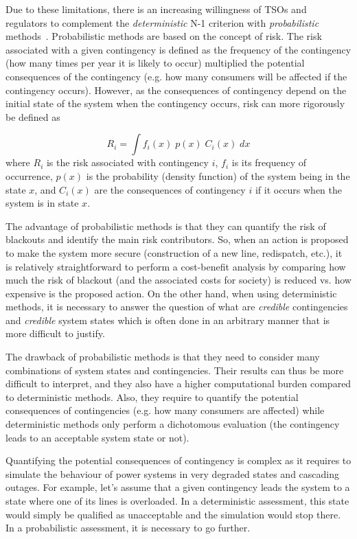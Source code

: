 Due to these limitations, there is an increasing willingness of TSOs and regulators to complement the \emph{deterministic} N-1 criterion with \emph{probabilistic} methods~\cite{ACER}. Probabilistic methods are based on the concept of risk. The risk associated with a given contingency is defined as the frequency of the contingency (how many times per year it is likely to occur) multiplied the potential consequences of the contingency (e.g. how many consumers will be affected if the contingency occurs). However, as the consequences of contingency depend on the initial state of the system when the contingency occurs, risk can more rigorously be defined as

\begin{equation}
    \label{eq:risk}
    {R_i = \int f_i(x) \; p(x) \; C_i(x) \; dx}
\end{equation}
\noindent where \(R_i\) is the risk associated with contingency \(i\), \(f_i\) is its frequency of occurrence, \(p(x)\) is the probability (density function) of the system being in the state \(x\), and \(C_i(x)\) are the consequences of contingency \(i\) if it occurs when the system is in state \(x\).

The advantage of probabilistic methods is that they can quantify the risk of blackouts and identify the main risk contributors. So, when an action is proposed to make the system more secure (construction of a new line, redispatch, etc.), it is relatively straightforward to perform a cost-benefit analysis by comparing how much the risk of blackout (and the associated costs for society) is reduced vs. how expensive is the proposed action. On the other hand, when using deterministic methods, it is necessary to answer the question of what are \emph{credible} contingencies and \emph{credible} system states which is often done in an arbitrary manner that is more difficult to justify.

The drawback of probabilistic methods is that they need to consider many combinations of system states and contingencies. Their results can thus be more difficult to interpret, and they also have a higher computational burden compared to deterministic methods. Also, they require to quantify the potential consequences of contingencies (e.g. how many consumers are affected) while deterministic methods only perform a dichotomous evaluation (the contingency leads to an acceptable system state or not).

Quantifying the potential consequences of contingency is complex as it requires to simulate the behaviour of power systems in very degraded states and cascading outages. For example, let's assume that a given contingency leads the system to a state where one of its lines is overloaded. In a deterministic assessment, this state would simply be qualified as unacceptable and the simulation would stop there. In a probabilistic assessment, it is necessary to go further.

